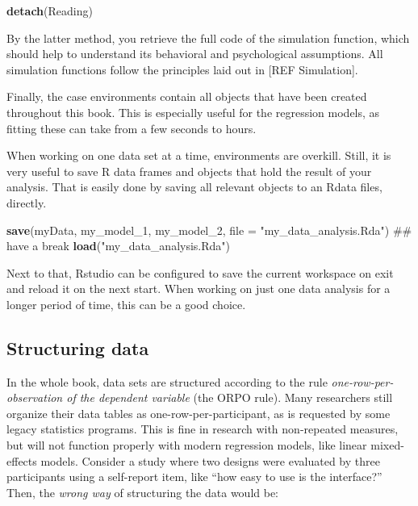 \documentclass[]{svmono}
\newenvironment{Shaded}{\begin{snugshade}}{\end{snugshade}}
\newcommand{\KeywordTok}[1]{\textcolor[rgb]{0.13,0.29,0.53}{\textbf{#1}}}
\newcommand{\DataTypeTok}[1]{\textcolor[rgb]{0.13,0.29,0.53}{#1}}
\newcommand{\DecValTok}[1]{\textcolor[rgb]{0.00,0.00,0.81}{#1}}
\newcommand{\StringTok}[1]{\textcolor[rgb]{0.31,0.60,0.02}{#1}}
\newcommand{\NormalTok}[1]{#1}
\begin{document}
\begin{Shaded}
\begin{Highlighting}[]
\KeywordTok{detach}\NormalTok{(Reading)}
\end{Highlighting}
\end{Shaded}

By the latter method, you retrieve the full code of the simulation
function, which should help to understand its behavioral and
psychological assumptions. All simulation functions follow the
principles laid out in {[}REF Simulation{]}.

Finally, the case environments contain all objects that have been
created throughout this book. This is especially useful for the
regression models, as fitting these can take from a few seconds to
hours.

When working on one data set at a time, environments are overkill.
Still, it is very useful to save R data frames and objects that hold the
result of your analysis. That is easily done by saving all relevant
objects to an Rdata files, directly.

\begin{Shaded}
\begin{Highlighting}[]
\KeywordTok{save}\NormalTok{(myData, my_model_}\DecValTok{1}\NormalTok{, my_model_}\DecValTok{2}\NormalTok{, }
     \DataTypeTok{file =} \StringTok{"my_data_analysis.Rda"}\NormalTok{)}
\NormalTok{## have a break}
\KeywordTok{load}\NormalTok{(}\StringTok{"my_data_analysis.Rda"}\NormalTok{)}
\end{Highlighting}
\end{Shaded}

Next to that, Rstudio can be configured to save the current workspace on
exit and reload it on the next start. When working on just one data
analysis for a longer period of time, this can be a good choice.

\subsection{Structuring data}\label{structuring-data}

In the whole book, data sets are structured according to the rule
\emph{one-row-per-observation of the dependent variable} (the ORPO
rule). Many researchers still organize their data tables as
one-row-per-participant, as is requested by some legacy statistics
programs. This is fine in research with non-repeated measures, but will
not function properly with modern regression models, like linear
mixed-effects models. Consider a study where two designs were evaluated
by three participants using a self-report item, like ``how easy to use
is the interface?'' Then, the \emph{wrong way} of structuring the data
would be:
\end{document}
